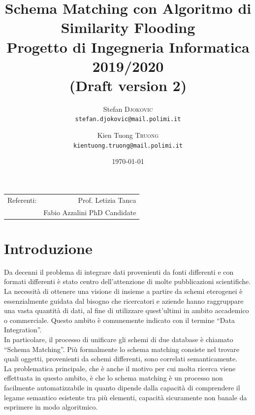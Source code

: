 \documentclass[a4paper,10pt]{article}
\title{Schema Matching con Algoritmo di Similarity Flooding \\ Progetto di Ingegneria Informatica 2019/2020\\
\large (Draft version 2)} %
\author{Stefan \textsc{Djokovic} \\
	\texttt{stefan.djokovic@mail.polimi.it}
	\and Kien Tuong \textsc{Truong} \\
	\texttt{kientuong.truong@mail.polimi.it}} %
\date{\today} %
\begin{document}
\maketitle %

\begin{center}
\begin{tabular}{l r}
Referenti: & Prof. Letizia Tanca\\ %
& Fabio Azzalini PhD Candidate
\end{tabular}
\end{center}



\section{Introduzione}

Da decenni il problema di integrare dati provenienti da fonti differenti e con formati differenti è stato centro dell’attenzione di molte pubblicazioni scientifiche. La necessità di ottenere una visione di insieme a partire da schemi eterogenei è essenzialmente guidata dal bisogno che ricercatori e aziende hanno raggruppare una vasta quantità di dati, al fine di utilizzare quest’ultimi in ambito accademico o commerciale. Questo ambito è comunemente indicato con il termine “Data Integration”.\\

In particolare, il processo di unificare gli schemi di due database è chiamato “Schema Matching”. Più formalmente lo schema matching consiste nel trovare quali oggetti, provenienti da schemi differenti, sono correlati semanticamente.\\

La problematica principale, che è anche il motivo per cui molta ricerca viene effettuata in questo ambito, è che lo schema matching è un processo non facilmente automatizzabile in quanto dipende dalla capacità di comprendere il legame semantico esistente tra più elementi, capacità sicuramente non banale da esprimere in modo algoritmico.\\
\end{document}
